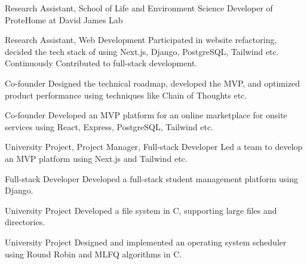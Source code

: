 \documentclass[11pt]{article}
\begin{document}
{Research Assistant, School of Life and Environment Science}
{Developer of ProteHome at David James Lab}


{Research Assistant, Web Development}
{Participated in website refactoring, decided the tech stack of using Next.js, Django, PostgreSQL, Tailwind etc. Continuously Contributed to full-stack development.}

{Co-founder}
{Designed the technical roadmap, developed the MVP, and optimized product performance using techniques like Chain of Thoughts etc.}

{Co-founder}
{Developed an MVP platform for an online marketplace for onsite services using React, Express, PostgreSQL, Tailwind etc.}

{University Project, Project Manager, Full-stack Developer}
{Led a team to develop an MVP platform using Next.js and Tailwind etc.}

{Full-stack Developer}
{Developed a full-stack student management platform using Django.}

{University Project}
{Developed a file system in C, supporting large files and directories.}

{University Project}
{Designed and implemented an operating system scheduler using Round Robin and MLFQ algorithms in C.}
\end{document}
